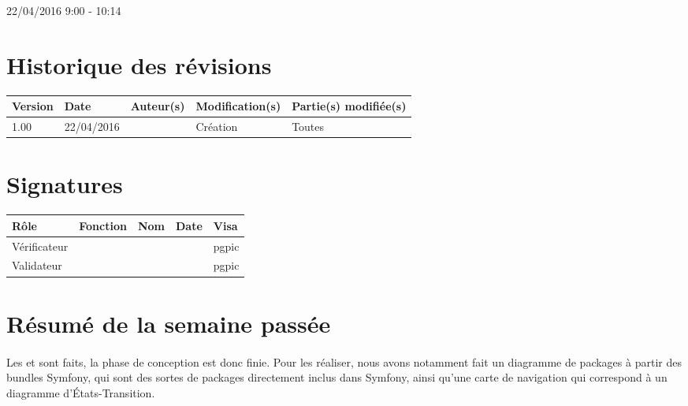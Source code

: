 \documentclass [a4paper] {article}
\begin{document}
22/04/2016			 				%
\hfill   
\hfill 	 9:00 - 10:14				%


\section*{Historique des révisions}
\begin{center}
			\begin{tabular}{| p{2.5cm} | p{3cm} | p{3cm} | p{3cm} | p{3.5cm} |}
				\hline
				\rowcolor{Gray}
				Version & Date & Auteur(s) & Modification(s) & Partie(s) modifiée(s)		 \\
				\hline
				1.00 & 22/04/2016 & \Pierre & Création & Toutes \\
		\hline		
			\end{tabular}
		\end{center}

\section*{Signatures}

		\begin{center}
			\begin{tabular}{| p{2.5cm} | p{4cm} | p{3cm} | p{3cm} | p{2.5cm} |}
				\hline
				\rowcolor{Gray}
				Rôle & Fonction & Nom & Date & Visa		 \\
				\hline
				Vérificateur & \RQA & \Kafui &  & pgpic \\[30pt]
				\hline
				Validateur & \CP & \Sergi &  & pgpic \\[30pt]	
				\hline
			\end{tabular}
		\end{center}


\section{Résumé de la semaine passée}
\paragraph*{}
Les \DCP{} et \DCD{} sont faits, la phase de conception est donc finie. Pour les réaliser, nous avons notamment fait un diagramme de packages à partir des bundles Symfony, qui sont des sortes de packages directement inclus dans Symfony, ainsi qu'une carte de navigation qui correspond à un diagramme d'États-Transition.
\end{document}
